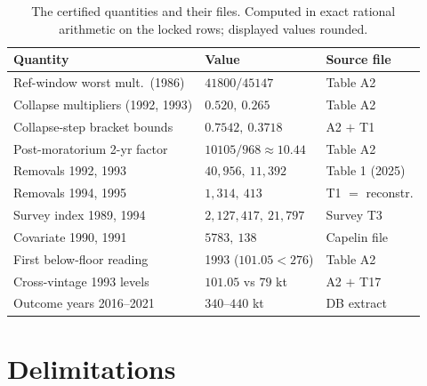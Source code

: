 \documentclass[10pt,twocolumn]{article}
\theoremstyle{plain}
\theoremstyle{remark}
\begin{document}
\begin{table}[t]
\centering
\scriptsize
\setlength{\tabcolsep}{2.8pt}
\caption{The certified quantities and their files. Computed in exact
rational arithmetic on the locked rows; displayed values rounded.}
\label{tab:summary}
\begin{tabular}{@{}l l l@{}}
\toprule
Quantity & Value & Source file \\
\midrule
Ref-window worst mult.\ (1986) & \(41800/45147\) & Table A2 \\
Collapse multipliers (1992, 1993) & \(0.520,\ 0.265\) & Table A2 \\
Collapse-step bracket bounds & \(0.7542,\ 0.3718\) & A2 $+$ T1 \\
Post-moratorium 2-yr factor & \(10105/968 \approx 10.44\) & Table A2 \\
Removals 1992, 1993 & \(40{,}956,\ 11{,}392\) & Table 1 (2025) \\
Removals 1994, 1995 & \(1{,}314,\ 413\) & T1 $=$ reconstr. \\
Survey index 1989, 1994 & \(2{,}127{,}417,\ 21{,}797\) & Survey T3 \\
Covariate 1990, 1991 & \(5783,\ 138\) & Capelin file \\
First below-floor reading & 1993 (\(101.05 < 276\)) & Table A2 \\
Cross-vintage 1993 levels & \(101.05\) vs \(79\) kt & A2 $+$ T17 \\
Outcome years 2016--2021 & \(340\)--\(440\) kt & DB extract \\
\bottomrule
\end{tabular}
\end{table}

\section{Delimitations}\label{scope}
\end{document}
